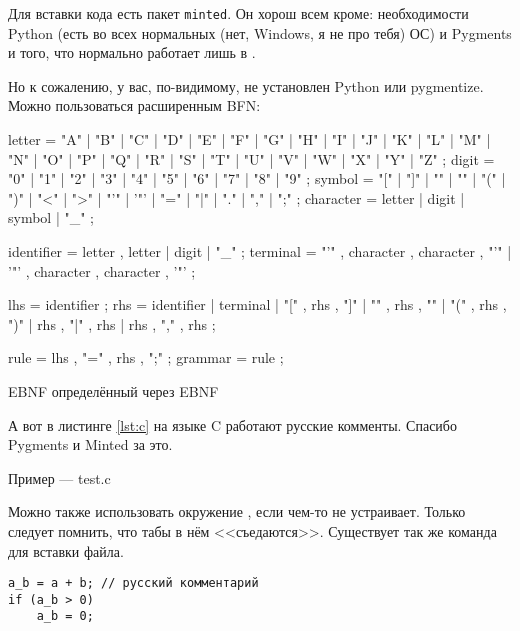 \else

Для вставки кода есть пакет \texttt{minted}. Он хорош всем кроме: необходимости Python (есть во всех нормальных (нет, Windows, я не про тебя) ОС) и Pygments и того, что нормально работает лишь в \XeLaTeX.

\ifdefined\NoMinted
Но к сожалению, у вас, по-видимому, не установлен Python или pygmentize.
\else
Можно пользоваться расширенным BFN:

\begin{listing}[H]
\begin{ebnfcode}
 letter = "A" | "B" | "C" | "D" | "E" | "F" | "G"
       | "H" | "I" | "J" | "K" | "L" | "M" | "N"
       | "O" | "P" | "Q" | "R" | "S" | "T" | "U"
       | "V" | "W" | "X" | "Y" | "Z" ;
digit = "0" | "1" | "2" | "3" | "4" | "5" | "6" | "7" | "8" | "9" ;
symbol = "[" | "]" | "{" | "}" | "(" | ")" | "<" | ">"
       | "'" | '"' | "=" | "|" | "." | "," | ";" ;
character = letter | digit | symbol | "_" ;
 
identifier = letter , { letter | digit | "_" } ;
terminal = "'" , character , { character } , "'" 
         | '"' , character , { character } , '"' ;
 
lhs = identifier ;
rhs = identifier
     | terminal
     | "[" , rhs , "]"
     | "{" , rhs , "}"
     | "(" , rhs , ")"
     | rhs , "|" , rhs
     | rhs , "," , rhs ;
 
rule = lhs , "=" , rhs , ";" ;
grammar = { rule } ;
\end{ebnfcode}
\caption{EBNF определённый через EBNF}
\label{lst:ebnf}
\end{listing}

А вот в листинге \ref{lst:c} на языке C работают русские комменты. Спасибо Pygments и Minted за это.

\begin{listing}[H]
\caption{Пример — test.c} 
\end{listing}
\label{lst:c}

\fi
\fi




Можно также использовать окружение , если  чем-то не
устраивает. Только следует помнить, что табы в нём <<съедаются>>. Существует так же команда  для вставки файла.

\begin{verbatim}
a_b = a + b; // русский комментарий
if (a_b > 0)
    a_b = 0;
\end{verbatim}

